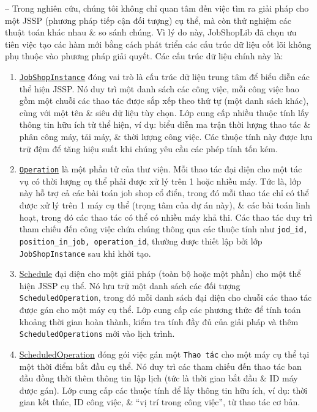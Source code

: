 \documentclass{article}
\begin{document}
\begin{itemize}
\begin{itemize}
        -- Trong nghiên cứu, chúng tôi không chỉ quan tâm đến việc tìm ra giải pháp cho một JSSP (phương pháp tiếp cận đối tượng) cụ thể, mà còn thử nghiệm các thuật toán khác nhau \& so sánh chúng. Vì lý do này, JobShopLib đã chọn ưu tiên việc tạo các hàm mới bằng cách phát triển các cấu trúc dữ liệu cốt lõi không phụ thuộc vào phương pháp giải quyết. Các cấu trúc dữ liệu chính này là:
        \begin{enumerate}
            \item \href{https://job-shop-lib.readthedocs.io/en/stable/api/job_shop_lib.html#job_shop_lib.JobShopInstance}{\tt JobShopInstance} đóng vai trò là cấu trúc dữ liệu trung tâm để biểu diễn các thể hiện JSSP. Nó duy trì một danh sách các công việc, mỗi công việc bao gồm một chuỗi các thao tác được sắp xếp theo thứ tự (một danh sách khác), cùng với một tên \& siêu dữ liệu tùy chọn. Lớp cung cấp nhiều thuộc tính lấy thông tin hữu ích từ thể hiện, ví dụ: biểu diễn ma trận thời lượng thao tác \& phân công máy, tải máy, \& thời lượng công việc. Các thuộc tính này được lưu trữ đệm để tăng hiệu suất khi chúng yêu cầu các phép tính tốn kém.
            \item \href{https://job-shop-lib.readthedocs.io/en/stable/api/job_shop_lib.html#job_shop_lib.Operation}{\tt Operation} là một phần tử của thư viện. Mỗi thao tác đại diện cho một tác vụ có thời lượng cụ thể phải được xử lý trên 1 hoặc nhiều máy. Tức là, lớp này hỗ trợ cả các bài toán job shop cổ điển, trong đó mỗi thao tác chỉ có thể được xử lý trên 1 máy cụ thể (trọng tâm của dự án này), \& các bài toán linh hoạt, trong đó các thao tác có thể có nhiều máy khả thi. Các thao tác duy trì tham chiếu đến công việc chứa chúng thông qua các thuộc tính như \verb|jod_id, position_in_job, operation_id|, thường được thiết lập bởi lớp {\tt JobShopInstance} sau khi khởi tạo.
            \item \href{https://job-shop-lib.readthedocs.io/en/stable/api/job_shop_lib.html#job_shop_lib.Schedule}{Schedule} đại diện cho một giải pháp (toàn bộ hoặc một phần) cho một thể hiện JSSP cụ thể. Nó lưu trữ một danh sách các đối tượng {\tt ScheduledOperation}, trong đó mỗi danh sách đại diện cho chuỗi các thao tác được gán cho một máy cụ thể. Lớp cung cấp các phương thức để tính toán khoảng thời gian hoàn thành, kiểm tra tính đầy đủ của giải pháp và thêm {\tt ScheduledOperations} mới vào lịch trình.
            \item \href{https://job-shop-lib.readthedocs.io/en/stable/api/job_shop_lib.html#job_shop_lib.ScheduledOperation}{ScheduledOperation} đóng gói việc gán một {\tt Thao tác} cho một máy cụ thể tại một thời điểm bắt đầu cụ thể. Nó duy trì các tham chiếu đến thao tác ban đầu đồng thời thêm thông tin lập lịch (tức là thời gian bắt đầu \& ID máy được gán). Lớp cung cấp các thuộc tính để lấy thông tin hữu ích, ví dụ: thời gian kết thúc, ID công việc, \& ``vị trí trong công việc'', từ thao tác cơ bản.

\end{enumerate}
\end{itemize}
\end{itemize}
\end{document}
